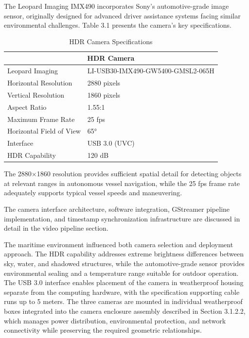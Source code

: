 \documentclass{erauthesis}
\begin{document}
The Leopard Imaging IMX490 incorporates Sony's automotive-grade image sensor, originally designed for advanced driver assistance systems facing similar environmental challenges.
Table 3.1 presents the camera's key specifications.

\begin{table}[h]
\centering
\caption{HDR Camera Specifications}
\begin{tabular}{ll}
\hline
\multicolumn{2}{c}{HDR Camera}\\
\hline
\hline
Leopard Imaging & LI-USB30-IMX490-GW5400-GMSL2-065H \\
Horizontal Resolution & 2880 pixels \\
Vertical Resolution & 1860 pixels \\
Aspect Ratio & 1.55:1 \\
Maximum Frame Rate & 25 fps \\
Horizontal Field of View & 65° \\
Interface & USB 3.0 (UVC) \\
HDR Capability & 120 dB \\
\hline
\end{tabular}
\label{tab:hdr_camera_specs}
\end{table}

The 2880×1860 resolution provides sufficient spatial detail for detecting objects at relevant ranges in autonomous vessel navigation, while the 25 fps frame rate adequately supports typical vessel speeds and maneuvering.

The camera interface architecture, software integration, GStreamer pipeline implementation, and timestamp synchronization infrastructure are discussed in detail in the video pipeline section.

The maritime environment influenced both camera selection and deployment approach.
The \ac{HDR} capability addresses extreme brightness differences between sky, water, and shadowed structures, while the automotive-grade sensor provides environmental sealing and a temperature range suitable for outdoor operation.
The USB 3.0 interface enables placement of the camera in weatherproof housing separate from the computing hardware, with the specification supporting cable runs up to 5 meters.
The three cameras are mounted in individual weatherproof boxes integrated into the camera enclosure assembly described in Section 3.1.2.2, which manages power distribution, environmental protection, and network connectivity while preserving the required geometric relationships.
\end{document}
